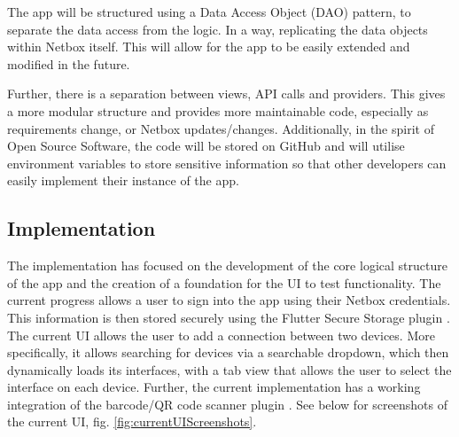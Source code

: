 \documentclass [11pt,a4paper]{article}
\begin{document}
The app will be structured using a Data Access Object (DAO) pattern\cite{dao}, to separate the data access from the logic. In a way, replicating the data objects within Netbox itself. This will allow for the app to be easily extended and modified in the future. 

Further, there is a separation between views, API calls and providers. This gives a more modular structure and provides more maintainable code, especially as requirements change, or Netbox updates/changes. Additionally, in the spirit of Open Source Software, the code will be stored on GitHub \cite{keeptrackgithub} and will utilise environment variables to store sensitive information so that other developers can easily implement their instance of the app.

\subsection{Implementation}
\label{sec:implementation}
The implementation has focused on the development of the core logical structure of the app and the creation of a foundation for the UI to test functionality. The current progress allows a user to sign into the app using their Netbox credentials. This information is then stored securely using the Flutter Secure Storage plugin \cite{securestorage}. The current UI allows the user to add a connection between two devices. More specifically, it allows searching for devices via a searchable dropdown, which then dynamically loads its interfaces, with a tab view that allows the user to select the interface on each device. Further, the current implementation has a working integration of the barcode/QR code scanner plugin \cite{barcodeScannerPlugin}. See below for screenshots of the current UI, fig. \ref{fig:currentUIScreenshots}. 
\end{document}
